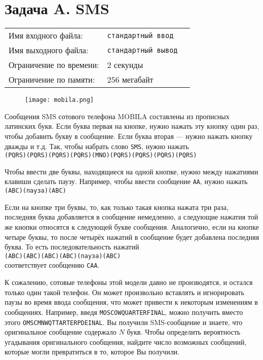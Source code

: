\documentclass[12pt]{scrartcl}
\newcommand{\inputFile}{стандартный ввод}
\newcommand{\outputFile}{стандартный вывод}
\begin{document}
\singlespacing

\section*{Задача A. SMS}

\begin{tabularx}{\textwidth}{l l X}
    Имя входного файла: & \texttt{\inputFile} \\
    Имя выходного файла: & \texttt{\outputFile} \\
    Ограничение по времени: & $2$ секунды \\
    Ограничение по памяти: & $256$ мегабайт \\
\end{tabularx}

\begin{figure}[h]
    \texttt{[image: mobila.png]}
\end{figure}

Сообщения SMS сотового телефона MOBILA составлены из прописных латинских букв.
Если буква первая на кнопке, нужно нажать эту кнопку один раз,
чтобы добавить букву в сообщение. Если буква вторая --- нужно нажать кнопку дважды и т.д.
Так, чтобы набрать слово \texttt{SMS}, нужно нажать \\
\texttt{(PQRS)(PQRS)(PQRS)(PQRS)(MNO)(PQRS)(PQRS)(PQRS)(PQRS)}

Чтобы ввести две буквы, находящиеся на одной кнопке,
нужно между нажатиями клавиши сделать паузу.
Например, чтобы ввести сообщение \texttt{AA}, нужно нажать \\
\texttt{(ABC)(пауза)(ABC)}

Если на кнопке три буквы, то, как только такая кнопка нажата три раза,
последняя буква добавляется в сообщение немедленно, а следующие нажатия
той же кнопки относятся к следующей букве сообщения. Аналогично,
если на кнопке четыре буквы, то после четырёх нажатий в сообщение
будет добавлена последняя буква. То есть последовательность нажатий \\
\texttt{(ABC)(ABC)(ABC)(ABC)(пауза)(ABC)} \\
соответствует сообщению \texttt{CAA}.

К сожалению, сотовые телефоны этой модели давно не производятся,
и остался только один такой телефон. Он может произвольно вставлять
и игнорировать паузы во время ввода сообщения, что может привести к
некоторым изменениям в сообщениях. Например, введя \texttt{MOSCOWQUARTERFINAL},
можно получить вместо этого \texttt{OMSCMNWQTTARTERPDEINAL}.
Вы получили SMS-сообщение и знаете, что оригинальное сообщение содержало $N$ букв. Чтобы определить вероятность угадывания оригинального сообщения, найдите число возможных сообщений, которые могли превратиться в то, которое Вы получили.
\end{document}
